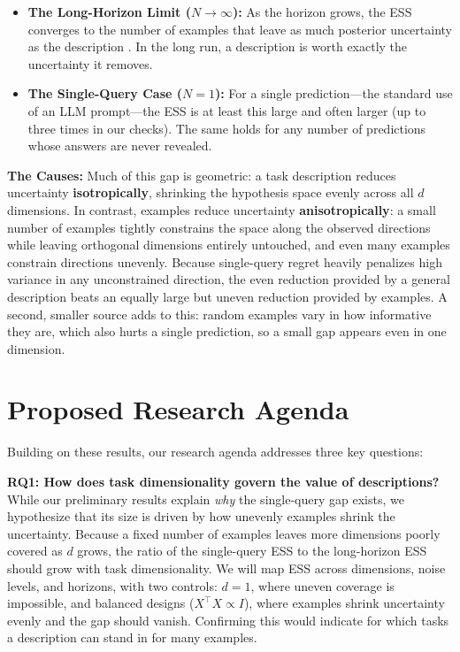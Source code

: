 \documentclass[10pt,letterpaper]{article}
\begin{document}
\begin{itemize}
\item \textbf{The Long-Horizon Limit ($N \to \infty$):} As the horizon grows, the ESS converges to the number of examples that leave as much posterior uncertainty as the description \citep{clarke1990}. In the long run, a description is worth exactly the uncertainty it removes.
\item \textbf{The Single-Query Case ($N = 1$):} For a single prediction---the standard use of an LLM prompt---the ESS is at least this large and often larger (up to three times in our checks). The same holds for any number of predictions whose answers are never revealed.
\end{itemize}

\textbf{The Causes:} Much of this gap is geometric: a task description reduces uncertainty \textbf{isotropically}, shrinking the hypothesis space evenly across all $d$ dimensions. In contrast, examples reduce uncertainty \textbf{anisotropically}: a small number of examples tightly constrains the space along the observed directions while leaving orthogonal dimensions entirely untouched, and even many examples constrain directions unevenly. Because single-query regret heavily penalizes high variance in any unconstrained direction, the even reduction provided by a general description beats an equally large but uneven reduction provided by examples. A second, smaller source adds to this: random examples vary in how informative they are, which also hurts a single prediction, so a small gap appears even in one dimension.

\section{Proposed Research Agenda}
Building on these results, our research agenda addresses three key questions:

\textbf{RQ1: How does task dimensionality govern the value of descriptions?} While our preliminary results explain \emph{why} the single-query gap exists, we hypothesize that its size is driven by how unevenly examples shrink the uncertainty. Because a fixed number of examples leaves more dimensions poorly covered as $d$ grows, the ratio of the single-query ESS to the long-horizon ESS should grow with task dimensionality. We will map ESS across dimensions, noise levels, and horizons, with two controls: $d = 1$, where uneven coverage is impossible, and balanced designs ($X^\top X \propto I$), where examples shrink uncertainty evenly and the gap should vanish. Confirming this would indicate for which tasks a description can stand in for many examples.
\end{document}
